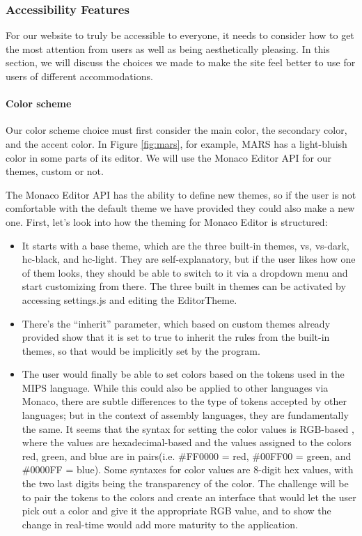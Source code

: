 \documentclass[
    parskip=half,
    fontsize=12pt,
    titlepage=firstiscover,
    toc=bibliography,
    numbers=endperiod
]{scrartcl}
\providecommand{\tightlist}{%
  \setlength{\itemsep}{0pt}\setlength{\parskip}{0pt}}
\begin{document}
\subsubsection{Accessibility Features}
\label{subsec:accessibility-features}

For our website to truly be accessible to everyone, it needs to consider
how to get the most attention from users as well as being aesthetically
pleasing. In this section, we will discuss the choices we made to make
the site feel better to use for users of different accommodations.

\paragraph{Color scheme}

Our color scheme choice must first consider the main color, the
secondary color, and the accent color. In Figure \ref{fig:mars}, for example, MARS
has a light-bluish color in some parts of its editor. We will use the
Monaco Editor API for our themes, custom or not.

The Monaco Editor API has the ability to define new themes, so if the
user is not comfortable with the default theme we have provided they
could also make a new one. First, let's look into how the theming for
Monaco Editor is structured:

\begin{itemize}
    \tightlist
    \item It starts with a base theme, which are the three built-in themes, vs,
    vs-dark, hc-black, and hc-light. They are self-explanatory, but if the
    user likes how one of them looks, they should be able to switch to it
    via a dropdown menu and start customizing from there. The three built
    in themes can be activated by accessing settings.js and editing the
    EditorTheme.
    \item There's the ``inherit'' parameter, which based on custom themes
    already provided \cite{monaco-themes} show that it is set to true to inherit the rules
    from the built-in themes, so that would be implicitly set by the
    program.
    \item The user would finally be able to set colors based on the tokens used
    in the MIPS language. While this could also be applied to other
    languages via Monaco, there are subtle differences to the type of
    tokens accepted by other languages; but in the context of assembly
    languages, they are fundamentally the same. It seems that the syntax
    for setting the color values is RGB-based \cite{rapidtables-rgb}, where the values are
    hexadecimal-based and the values assigned to the colors red, green,
    and blue are in pairs(i.e. \#FF0000 = red, \#00FF00 = green, and
    \#0000FF = blue). Some syntaxes for color values are 8-digit hex
    values, with the two last digits being the transparency of the color.
    The challenge will be to pair the tokens to the colors and create an
    interface that would let the user pick out a color and give it the
    appropriate RGB value, and to show the change in real-time would add
    more maturity to the application.
\end{itemize}
\end{document}
